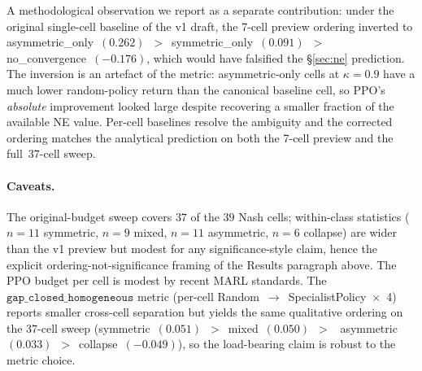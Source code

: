 \documentclass{anvil-paper}
\begin{document}
A methodological observation we report as a separate contribution:
under the original single-cell baseline of the v1 draft, the 7-cell
preview ordering inverted to
\textsf{asymmetric\_only}~$(0.262)$~$>$~\textsf{symmetric\_only}~$(0.091)$~$>$~%
\textsf{no\_convergence}~$(-0.176)$, which would have falsified the
\S\ref{sec:ne} prediction. The inversion is an artefact of the metric:
asymmetric-only cells at $\kappa{=}0.9$ have a much lower random-policy
return than the canonical baseline cell, so PPO's \emph{absolute}
improvement looked large despite recovering a smaller fraction of the
available NE value. Per-cell baselines resolve the ambiguity and the
corrected ordering matches the analytical prediction on both the 7-cell
preview and the full~$37$-cell sweep.

\paragraph{Caveats.}
The original-budget sweep covers $37$ of the $39$ Nash cells; within-class
statistics ($n{=}11$ symmetric, $n{=}9$ mixed, $n{=}11$ asymmetric,
$n{=}6$ collapse) are wider than the v1 preview but modest for any
significance-style claim, hence the explicit ordering-not-significance
framing of the Results paragraph above. The PPO budget per cell is
modest by recent MARL standards. The $\texttt{gap\_closed\_homogeneous}$
metric (per-cell Random~$\to$~SpecialistPolicy~$\times$~4) reports
smaller cross-cell separation but yields the same qualitative ordering
on the $37$-cell sweep
(\textsf{symmetric}~$(0.051)$~$>$~\textsf{mixed}~$(0.050)$~$>$~%
\textsf{asymmetric}~$(0.033)$~$>$~\textsf{collapse}~$(-0.049)$), so the
load-bearing claim is robust to the metric choice.
\end{document}
